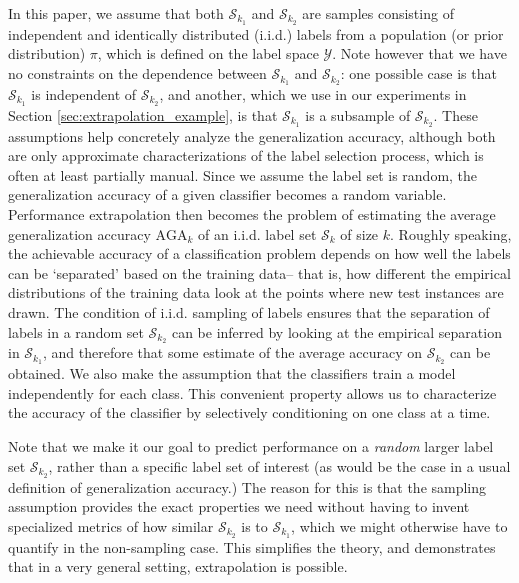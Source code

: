 \documentclass[twoside,11pt]{article}
\begin{document}
In this paper, we assume that both $\mathcal{S}_{k_1}$ and
$\mathcal{S}_{k_2}$ are samples consisting of independent and identically distributed (i.i.d.)
labels from a population (or prior distribution) $ \pi$, which is
defined on the label space $\mathcal{Y}$.  
Note however that we have no constraints on the dependence between $\mathcal{S}_{k_1}$ and
$\mathcal{S}_{k_2}$: one possible case is that $\mathcal{S}_{k_1}$ is independent of
$\mathcal{S}_{k_2}$, and another, which we use in our experiments in Section \ref{sec:extrapolation_example},
is that $\mathcal{S}_{k_1}$ is a subsample of $\mathcal{S}_{k_2}$.
These assumptions help
concretely analyze the generalization accuracy, although both are only
approximate characterizations of the label selection process, which is
often at least partially manual. Since we assume the label set is
random, the generalization accuracy of a given classifier becomes a
random variable.  Performance extrapolation then becomes the problem
of estimating the average generalization accuracy $\text{AGA}_k$ of an
i.i.d. label set $\mathcal{S}_k$ of size $k$.  
Roughly speaking, the achievable accuracy of a classification problem
depends on how well the labels can be `separated' based on the training data--
that is, how different the empirical distributions of the training data look
at the points where new test instances are drawn.  %
The condition of
i.i.d. sampling of labels ensures that the separation of labels in a
random set $\mathcal{S}_{k_2}$ can be inferred by looking at the
empirical separation in $\mathcal{S}_{k_1}$, and therefore that some
estimate of the average accuracy on $\mathcal{S}_{k_2}$ can be
obtained.  We also make the assumption that the classifiers train a
model independently for each class.  This convenient property allows us to
characterize the accuracy of the classifier by selectively
conditioning on one class at a time.

Note that we make it our goal to predict performance on a \emph{random} larger label set $\mathcal{S}_{k_2}$, rather than a specific label set of interest (as would be the case in a usual definition of generalization accuracy.)  The reason for this is that the sampling assumption provides the exact properties we need without having to invent specialized metrics of how similar $\mathcal{S}_{k_2}$ is to $\mathcal{S}_{k_1}$, which we might otherwise have to quantify in the non-sampling case.  This simplifies the theory, and demonstrates that in a very general setting, extrapolation is possible.
\end{document}
